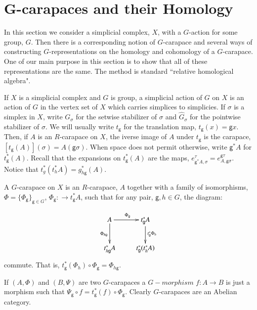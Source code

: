 \section{G-carapaces and their Homology}
In this section we consider a simplicial complex, $X$, with a $G$-action for some group, $G$. Then there is a corresponding notion of $G$-carapace and several ways of constructing $G$-representations on the homology and cohomology of a $G$-carapace. One of our main purpose in this section is to show that all of these representations are the same. The method is standard ``relative homological algebra".

If $X$ is a simplicial complex and $G$ is group, a simplicial action of $G$ on $X$ is an action of $G$ in the vertex set of $X$ which carries simplices to simplicies. If $\sigma$ is a simplex in $X$, write $G_{\sigma}$ for the setwise stabilizer of $\sigma$ and $\hat{G}_{\sigma}$ for the pointwise stabilizer of $\sigma$. We will usually write $t_{\mathsf{g}}$ for the translation map, $t_{\mathsf{g}}(x) =\mathsf{g}x$. Then, if $A$ is an $R$-carapace on $X$, the iverse image of $A$ under $t_{\mathsf{g}}$ is the carapace, $[t_{\mathsf{g}}(A)](\sigma) = A(\mathsf{g}\sigma)$. When space does not permit otherwise, write $\mathsf{g}^{*}A$ for $t_{\mathsf{g}}^ {*}(A)$. Recall that the expansions on $t_{\mathsf{g}}^{*}(A)$ are the maps, $e_{\mathsf{g}^{*} A, \sigma}^\tau = e_{A, \mathsf{g}\sigma}^{\mathsf{g}\tau}$.
Notice that $t_{g}^{*}(t_{h}^{*}A) = g_{h\mathsf{g}}^{*}(A)$.

\begin{definition}
A $G$-carapace on $X$ is an $R$-carapace, $A$ together with a family of isomorphisms,
$\Phi = \{\Phi_{\mathsf{g}}\}_{\mathsf{g} \in G}$, $\Phi_{\mathsf{g}} : \rightarrow t_{\mathsf{g}}^{*} A$, such that for any pair, $\mathsf{g}, h \in G$, the diagram: 
\end{definition}

\begin{equation}\label{art6-eq-8.2}
\vcenter{
\xymatrix{
A  \ar[r]^{\Phi_{\mathsf{g}}} \ar[d]_{\Phi_{h\mathsf{g}}} & t^*_{\mathsf{g}} A \ar[d]^{t_{\mathsf{g}}^{*} \Phi_{h}}\\
t_{h\mathsf{g}}^{*}A  & t_{\mathsf{g}}^{*}(t_{h}^{*}A)
}}
\end{equation}
commute. That is, $t_{\mathsf{g}}^{*}(\Phi_{h}) \circ \Phi_{\mathsf{g}} = \Phi_{h\mathsf{g}}$.

If $(A, \Phi)$ and $(B, \Psi)$ are two $G$-carapaces a $G-morphism$ $f: A\rightarrow B$ is just a morphism such that $\Psi_{\mathsf{g}} \circ  f = t_{\mathsf{g}}^{*}(f) \circ \Phi_{\mathsf{g}}$.  Clearly $G$-carapaces are an Abelian category.

